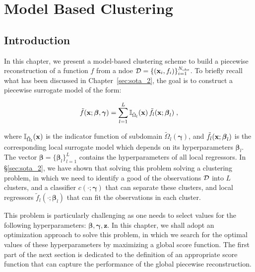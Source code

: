 %
\chapter{Model Based Clustering}
\label{sec:clustering}



\section{Introduction}
\label{sec:clustering:intro}

In this chapter, we present a model-based clustering scheme to build a piecewise reconstruction of a function $f$ from a \gls{ndoe} $\mathcal{D} = \{(\mathbf{x}_i, f_i)\}_{i=1}^{N_{\mathrm{obs}}}$. To briefly recall what has been discussed in Chapter~\ref{sec:sota_2}, the goal is to construct a piecewise surrogate model of the form:

\begin{equation}
  \tilde{f}(\mathbf{x}; \boldsymbol{\beta}, \boldsymbol{\gamma}) = \sum_{l=1}^L \mathbb{I}_{\tilde{\Omega}_l}(\mathbf{x})\, \tilde{f}_l(\mathbf{x}; \boldsymbol{\beta}_l) \;,
\end{equation}

where $\mathbb{I}_{\tilde{\Omega}_l}(\mathbf{x})$ is the indicator function of subdomain $\tilde{\Omega}_l(\boldsymbol{\gamma})$, and $\tilde{f}_l(\mathbf{x}; \boldsymbol{\beta}_l)$ is the corresponding local surrogate model which depends on its hyperparameters $\boldsymbol{\beta}_l$. The vector $\boldsymbol{\beta} = \{\boldsymbol{\beta}_l\}_{l=1}^L$ contains the hyperparameters of all local regressors. In \S\ref{sec:sota_2}, we have shown that solving this problem  solving a clustering problem, in which we need to identify a good  of the observations $\mathcal{D}$ into $L$ clusters, and a classifier $c(\cdot; \boldsymbol{\gamma})$ that can separate these clusters, and local regressors $\tilde{f}_l(\cdot; \boldsymbol{\beta}_l)$ that can fit the observations in each cluster. 

\smallskip
This problem is particularly challenging as one needs to select values for the following hyperparameters: $\boldsymbol{\beta}, \boldsymbol{\gamma}, \mathbf{z}$. In this chapter, we shall adopt an optimization approach to solve this problem, in which we search for the optimal values of these hyperparameters by maximizing a global score function. The first part of the next section is dedicated to the definition of an appropriate score function that can capture the performance of the global piecewise reconstruction. 

